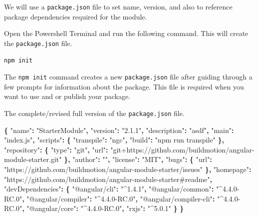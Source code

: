 \documentclass[]{book}
\newenvironment{Shaded}{\begin{snugshade}}{\end{snugshade}}
\newcommand{\StringTok}[1]{\textcolor[rgb]{0.31,0.60,0.02}{#1}}
\newcommand{\OperatorTok}[1]{\textcolor[rgb]{0.81,0.36,0.00}{\textbf{#1}}}
\theoremstyle{definition}
\theoremstyle{definition}
\theoremstyle{definition}
\theoremstyle{remark}
\begin{document}
We will use a \texttt{package.json} file to set name, version, and also
to reference package dependencies required for the module.

Open the Powershell Terminal and run the following command. This will
create the \texttt{package.json} file.

\begin{verbatim}
npm init
\end{verbatim}

The \texttt{npm\ init} command creates a new \texttt{package.json} file
after guiding through a few prompts for information about the package.
This file is required when you want to use and or publish your package.

The complete/revised full version of the \texttt{package.json} file.

\begin{Shaded}
\begin{Highlighting}[]
\OperatorTok{\{}
  \StringTok{"name"}\OperatorTok{:} \StringTok{"StarterModule"}\OperatorTok{,}
  \StringTok{"version"}\OperatorTok{:} \StringTok{"2.1.1"}\OperatorTok{,}
  \StringTok{"description"}\OperatorTok{:} \StringTok{"asdf"}\OperatorTok{,}
  \StringTok{"main"}\OperatorTok{:} \StringTok{"index.js"}\OperatorTok{,}
  \StringTok{"scripts"}\OperatorTok{:} \OperatorTok{\{}
    \StringTok{"transpile"}\OperatorTok{:} \StringTok{"ngc"}\OperatorTok{,}
    \StringTok{"build"}\OperatorTok{:} \StringTok{"npm run transpile"}
  \OperatorTok{\},}
  \StringTok{"repository"}\OperatorTok{:} \OperatorTok{\{}
    \StringTok{"type"}\OperatorTok{:} \StringTok{"git"}\OperatorTok{,}
    \StringTok{"url"}\OperatorTok{:} \StringTok{"git+https://github.com/buildmotion/angular-module-starter.git"}
  \OperatorTok{\},}
  \StringTok{"author"}\OperatorTok{:} \StringTok{""}\OperatorTok{,}
  \StringTok{"license"}\OperatorTok{:} \StringTok{"MIT"}\OperatorTok{,}
  \StringTok{"bugs"}\OperatorTok{:} \OperatorTok{\{}
    \StringTok{"url"}\OperatorTok{:} \StringTok{"https://github.com/buildmotion/angular-module-starter/issues"}
  \OperatorTok{\},}
  \StringTok{"homepage"}\OperatorTok{:} \StringTok{"https://github.com/buildmotion/angular-module-starter#readme"}\OperatorTok{,}
  \StringTok{"devDependencies"}\OperatorTok{:} \OperatorTok{\{}
    \StringTok{"@angular/cli"}\OperatorTok{:} \StringTok{"^1.4.1"}\OperatorTok{,}
    \StringTok{"@angular/common"}\OperatorTok{:} \StringTok{"^4.4.0-RC.0"}\OperatorTok{,}
    \StringTok{"@angular/compiler"}\OperatorTok{:} \StringTok{"^4.4.0-RC.0"}\OperatorTok{,}
    \StringTok{"@angular/compiler-cli"}\OperatorTok{:} \StringTok{"^4.4.0-RC.0"}\OperatorTok{,}
    \StringTok{"@angular/core"}\OperatorTok{:} \StringTok{"^4.4.0-RC.0"}\OperatorTok{,}
    \StringTok{"rxjs"}\OperatorTok{:} \StringTok{"^5.0.1"}
  \OperatorTok{\}}
\OperatorTok{\}}
\end{Highlighting}
\end{Shaded}
\end{document}
